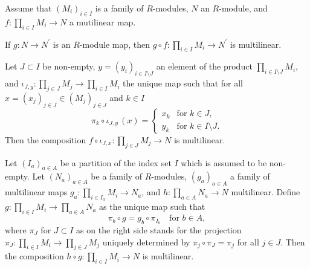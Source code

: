 \begin{lemma}\label{thm:construction-multilinear-maps-composition}
  Assume that $(M_i)_{i\in I}$ is a family of $R$-modules, $N$ an $R$-module, and
  $f : \prod_{i\in I}M_i \to N$ a mutilinear map.
  \begin{romanlist}
  \item
    If $g :N \to N^\prime$ is an $R$-module map, then
    $g\circ f :  \prod_{i\in I}M_i \to N^\prime$ is multilinear.
  \item
    Let $J\subset I$ be non-empty, $y= (y_i)_{i\in I\setminus J}$ an element of the product
    $\prod_{i\in I\setminus J} M_i$, and $ \iota_{J,y} :  \prod_{j\in J} M_j \to \prod_{i\in I} M_i$ the unique map
    such that for all $x = (x_j)_{j\in J} \in  (M_j)_{j\in J}$ and $k\in I$
    \[
      \pi_k \circ \iota_{J,y}\, (x) = 
      \begin{cases}
        x_k & \text{for } k\in J , \\
        y_k & \text{for } k \in I\setminus J .
      \end{cases}
    \]
    Then the composition $f\circ \iota_{J,x} : \prod_{j\in J} M_j \to N$ is multilinear.
 \item\label{ite:multilinearity-composition-multilinear-map-product-multilinear-map}
   Let $(I_a)_{a \in A}$ be a partition of the index set $I$ which is assumed to be non-empty.
   Let $(N_a)_{a \in A}$ be a family of $R$-modules, $(g_a)_{a \in A}$
   a family of multilinear maps $g_a : \prod_{i \in I_a} M_i \to N_a$, and
   $h :  \prod_{a \in A}N_a \to N$ multilinear. Define
   $g: \prod_{i\in I} M_i \to  \prod_{a \in A} N_a $ as the unique map
   such that 
   \[
      \pi_b \circ g = g_b \circ \pi_{I_b} \quad 
      \text{for } b \in A  ,
    \]
    where $\pi_J$ for $J\subset I$ as on the right side stands for the
    projection $\pi_J : \prod_{i\in I} M_i \to  \prod_{j \in J} M_j$
    uniquely determined by $\pi_j \circ \pi_J =\pi_j$ for all $j\in J$. 
   Then the  composition $h \circ g : \prod_{i\in I} M_i \to N$ is multilinear.
  \end{romanlist}
\end{lemma}

